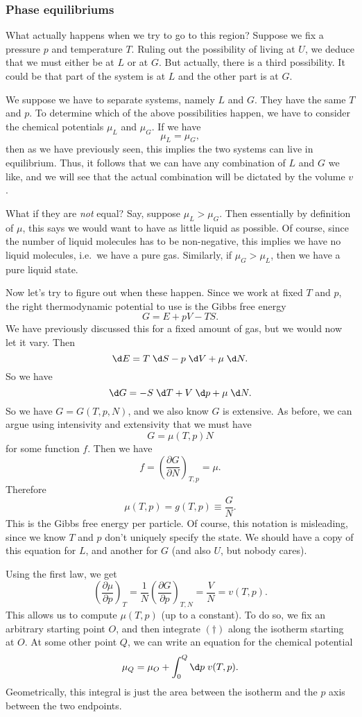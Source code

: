 \documentclass[a4paper]{article}
\begin{document}
\subsubsection*{Phase equilibriums}
What actually happens when we try to go to this region? Suppose we fix a pressure $p$ and temperature $T$. Ruling out the possibility of living at $U$, we deduce that we must either be at $L$ or at $G$. But actually, there is a third possibility. It could be that part of the system is at $L$ and the other part is at $G$.

We suppose we have to separate systems, namely $L$ and $G$. They have the same $T$ and $p$. To determine which of the above possibilities happen, we have to consider the chemical potentials $\mu_L$ and $\mu_G$. If we have
\[
  \mu_L = \mu_G,
\]
then as we have previously seen, this implies the two systems can live in equilibrium. Thus, it follows that we can have any combination of $L$ and $G$ we like, and we will see that the actual combination will be dictated by the volume $v$.

What if they are \emph{not} equal? Say, suppose $\mu_L > \mu_G$. Then essentially by definition of $\mu$, this says we would want to have as little liquid as possible. Of course, since the number of liquid molecules has to be non-negative, this implies we have no liquid molecules, i.e.\, we have a pure gas. Similarly, if $\mu_G > \mu_L$, then we have a pure liquid state.

Now let's try to figure out when these happen. Since we work at fixed $T$ and $p$, the right thermodynamic potential to use is the Gibbs free energy
\[
  G = E + pV - TS.
\]
We have previously discussed this for a fixed amount of gas, but we would now let it vary. Then
\[
  \d E = T\;\d S - p\;\d V + \mu \;\d N.
\]
So we have
\[
  \d G = - S\;\d T + V \;\d p + \mu \;\d N.
\]
So we have $G = G(T, p, N)$, and we also know $G$ is extensive. As before, we can argue using intensivity and extensivity that we must have
\[
  G = \mu(T, p) N
\]
for some function $f$. Then we have
\[
  f = \left(\frac{\partial G}{\partial N}\right)_{T, p} = \mu.
\]
Therefore
\[
  \mu(T, p) = g(T, p) \equiv \frac{G}{N}.
\]
This is the Gibbs free energy per particle. Of course, this notation is misleading, since we know $T$ and $p$ don't uniquely specify the state. We should have a copy of this equation for $L$, and another for $G$ (and also $U$, but nobody cares).

Using the first law, we get
\[
  \left(\frac{\partial \mu}{\partial p}\right)_T = \frac{1}{N} \left(\frac{\partial G}{\partial p}\right)_{T, N} = \frac{V}{N} = v(T, p).\tag{$\dagger$}
\]
This allows us to compute $\mu(T, p)$ (up to a constant). To do so, we fix an arbitrary starting point $O$, and then integrate $(\dagger)$ along the isotherm starting at $O$. At some other point $Q$, we can write an equation for the chemical potential
\[
  \mu_Q= \mu_O + \int_0^Q \d p\; v(T, p).
\]
Geometrically, this integral is just the area between the isotherm and the $p$ axis between the two endpoints.
\end{document}
